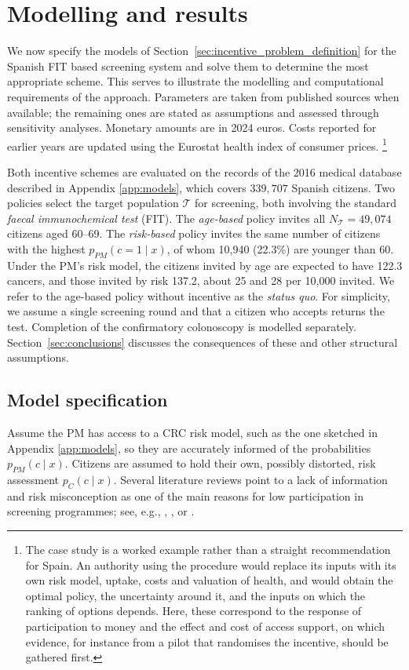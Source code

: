 \documentclass[12pt]{article}
\begin{document}
\section{Modelling and results} \label{sec:modelling_results}
We now specify the models of Section~\ref{sec:incentive_problem_definition} for the Spanish FIT based screening system and solve them to determine the most appropriate scheme. This serves to illustrate the modelling and computational requirements of the approach.  Parameters are taken from published sources when available; the remaining ones are stated as assumptions and assessed through sensitivity analyses. Monetary amounts are in 2024 euros. Costs reported for earlier years are updated using the Eurostat health index of consumer prices. \footnote{The case study is a worked example rather than a straight recommendation for Spain. An authority using the procedure would replace its inputs with its own risk model, uptake, costs and valuation of health, and would obtain the optimal policy, the uncertainty around it, and the inputs on which the ranking of options depends. Here, these correspond to the response of participation to money and the effect and cost of access support, on which evidence, for instance from a pilot that randomises the incentive, should be gathered first.}

Both incentive schemes are evaluated on the records of the 2016 medical database described in Appendix \ref{app:models}, which covers $339{,}707$ Spanish citizens. Two policies select the target population $\mathcal{T}$ for screening, both involving the standard \emph{faecal immunochemical test} (FIT). The \emph{age-based} policy invites all $N_{\mathcal{T}} = 49{,}074$ citizens aged 60--69. The \emph{risk-based} policy invites the same number of citizens with the highest $p_{PM}(c=1 \mid x)$, of whom 10{,}940 (22.3\%) are younger than 60. Under the PM's risk model, the citizens invited by age are expected to have 122.3 cancers, and those invited by risk 137.2, about 25 and 28 per 10{,}000 invited. We refer to the age-based policy without incentive as the \emph{status quo}. For simplicity, we assume a single screening round and that a citizen who accepts returns the test. Completion of the confirmatory colonoscopy is modelled separately. Section~\ref{sec:conclusions} discusses the consequences of these and other structural assumptions.

\subsection{Model specification} \label{sec:public_scheme_modelling}
Assume the PM has access to a CRC risk model, such as the one sketched in Appendix \ref{app:models}, so they are accurately informed of the probabilities $p_{PM}(c \mid x)$. Citizens are assumed to hold their own, possibly distorted, risk assessment $p_C(c \mid x)$. Several literature reviews point to a lack of information and risk misconception as one of the main reasons for low participation in screening programmes; see, e.g., \cite{wee2005factors}, \cite{le2023exploring}, or \cite{berg2022reasons}. 
 
\end{document}
